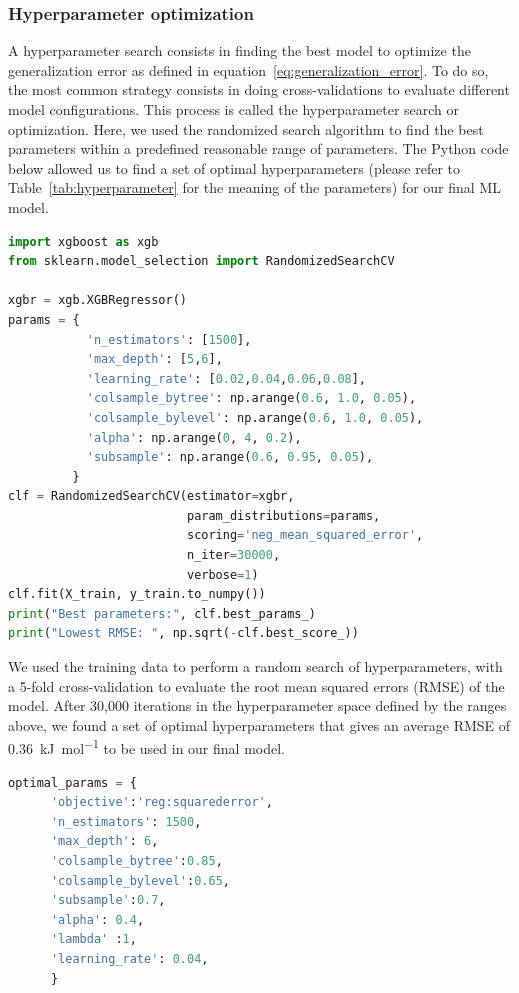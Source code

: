 \documentclass[main]{subfiles}
\begin{document}
\subsubsection{Hyperparameter optimization}\label{sct:hyperparameter}

A hyperparameter search consists in finding the best model to optimize the generalization error as defined in equation~\ref{eq:generalization_error}. To do so, the most common strategy consists in doing cross-validations to evaluate different model configurations. This process is called the hyperparameter search or optimization. Here, we used the randomized search algorithm to find the best parameters within a predefined reasonable range of parameters. The Python code below allowed us to find a set of optimal hyperparameters (please refer to Table~\ref{tab:hyperparameter} for the meaning of the parameters) for our final ML model.

\begin{lstlisting}[language=Python]
import xgboost as xgb
from sklearn.model_selection import RandomizedSearchCV

xgbr = xgb.XGBRegressor()
params = {
           'n_estimators': [1500],
           'max_depth': [5,6],
           'learning_rate': [0.02,0.04,0.06,0.08],
           'colsample_bytree': np.arange(0.6, 1.0, 0.05),
           'colsample_bylevel': np.arange(0.6, 1.0, 0.05),
           'alpha': np.arange(0, 4, 0.2),
           'subsample': np.arange(0.6, 0.95, 0.05),
         }
clf = RandomizedSearchCV(estimator=xgbr,
                         param_distributions=params,
                         scoring='neg_mean_squared_error',
                         n_iter=30000,
                         verbose=1)
clf.fit(X_train, y_train.to_numpy())
print("Best parameters:", clf.best_params_)
print("Lowest RMSE: ", np.sqrt(-clf.best_score_))
\end{lstlisting}

We used the training data to perform a random search of hyperparameters, with a 5-fold cross-validation to evaluate the root mean squared errors (RMSE) of the model.
After 30,000 iterations in the hyperparameter space defined by the ranges above, we found a set of optimal hyperparameters that gives an average RMSE of \SI{0.36}{\kilo\joule\per\mole} to be used in our final model.

\begin{lstlisting}[language=Python]
  optimal_params = {
      'objective':'reg:squarederror',
      'n_estimators': 1500,
      'max_depth': 6,
      'colsample_bytree':0.85,
      'colsample_bylevel':0.65,
      'subsample':0.7,
      'alpha': 0.4,
      'lambda' :1,
      'learning_rate': 0.04,
      }
  \end{lstlisting}
\end{document}
